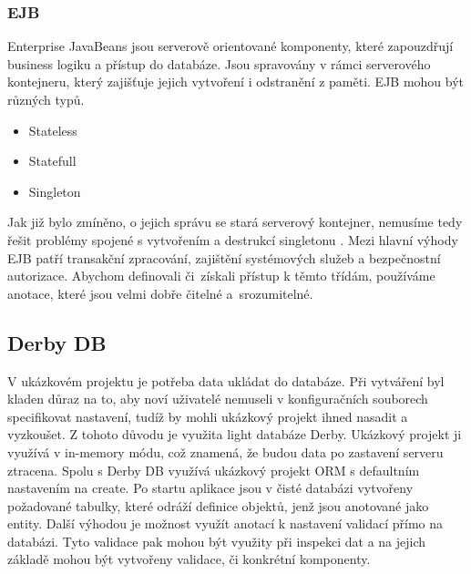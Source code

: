 \subsubsection{EJB}
Enterprise JavaBeans \cite{javaEETutorial} jsou serverově orientované komponenty, které zapouzdřují business logiku a přístup do databáze. Jsou spravovány v rámci serverového kontejneru, který zajišťuje jejich vytvoření i odstranění z paměti. EJB mohou být různých typů.
\begin{itemize}
\item Stateless
\item Statefull
\item Singleton
\end{itemize}
Jak již bylo zmíněno, o jejich správu se stará serverový kontejner, nemusíme tedy řešit problémy spojené s vytvořením a destrukcí singletonu \cite{gamma}. Mezi hlavní výhody EJB patří transakční zpracování, zajištění systémových služeb a bezpečnostní autorizace. Abychom definovali či~získali přístup k těmto třídám, používáme anotace, které jsou velmi dobře čitelné a~srozumitelné.
\subsection{Derby DB}
V ukázkovém projektu je potřeba data ukládat do databáze. Při vytváření byl kladen důraz na to, aby noví uživatelé nemuseli v konfiguračních souborech specifikovat nastavení, tudíž by mohli ukázkový projekt ihned nasadit a vyzkoušet. Z tohoto důvodu je využita light databáze Derby. Ukázkový projekt ji využívá v in-memory módu, což znamená, že budou data po zastavení serveru ztracena. Spolu s Derby DB využívá ukázkový projekt ORM s defaultním nastavením na create. Po startu aplikace jsou v čisté databázi vytvořeny požadované tabulky, které odráží definice objektů, jenž jsou anotované jako entity. Další výhodou je možnost využít anotací k nastavení validací přímo na databázi. Tyto validace pak mohou být využity při inspekci dat a na jejich základě mohou být vytvořeny validace, či konkrétní komponenty.